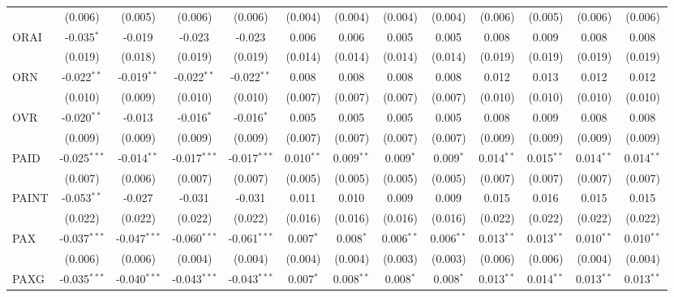 \begin{table}[!htbp]
\begin{tabular}{@{\extracolsep{5pt}}lcccccccccccc}
  & (0.006) & (0.005) & (0.006) & (0.006) & (0.004) & (0.004) & (0.004) & (0.004) & (0.006) & (0.005) & (0.006) & (0.006) \\
 ORAI & -0.035$^{*}$ & -0.019$^{}$ & -0.023$^{}$ & -0.023$^{}$ & 0.006$^{}$ & 0.006$^{}$ & 0.005$^{}$ & 0.005$^{}$ & 0.008$^{}$ & 0.009$^{}$ & 0.008$^{}$ & 0.008$^{}$ \\
  & (0.019) & (0.018) & (0.019) & (0.019) & (0.014) & (0.014) & (0.014) & (0.014) & (0.019) & (0.019) & (0.019) & (0.019) \\
 ORN & -0.022$^{**}$ & -0.019$^{**}$ & -0.022$^{**}$ & -0.022$^{**}$ & 0.008$^{}$ & 0.008$^{}$ & 0.008$^{}$ & 0.008$^{}$ & 0.012$^{}$ & 0.013$^{}$ & 0.012$^{}$ & 0.012$^{}$ \\
  & (0.010) & (0.009) & (0.010) & (0.010) & (0.007) & (0.007) & (0.007) & (0.007) & (0.010) & (0.010) & (0.010) & (0.010) \\
 OVR & -0.020$^{**}$ & -0.013$^{}$ & -0.016$^{*}$ & -0.016$^{*}$ & 0.005$^{}$ & 0.005$^{}$ & 0.005$^{}$ & 0.005$^{}$ & 0.008$^{}$ & 0.009$^{}$ & 0.008$^{}$ & 0.008$^{}$ \\
  & (0.009) & (0.009) & (0.009) & (0.009) & (0.007) & (0.007) & (0.007) & (0.007) & (0.009) & (0.009) & (0.009) & (0.009) \\
 PAID & -0.025$^{***}$ & -0.014$^{**}$ & -0.017$^{***}$ & -0.017$^{***}$ & 0.010$^{**}$ & 0.009$^{**}$ & 0.009$^{*}$ & 0.009$^{*}$ & 0.014$^{**}$ & 0.015$^{**}$ & 0.014$^{**}$ & 0.014$^{**}$ \\
  & (0.007) & (0.006) & (0.007) & (0.007) & (0.005) & (0.005) & (0.005) & (0.005) & (0.007) & (0.007) & (0.007) & (0.007) \\
 PAINT & -0.053$^{**}$ & -0.027$^{}$ & -0.031$^{}$ & -0.031$^{}$ & 0.011$^{}$ & 0.010$^{}$ & 0.009$^{}$ & 0.009$^{}$ & 0.015$^{}$ & 0.016$^{}$ & 0.015$^{}$ & 0.015$^{}$ \\
  & (0.022) & (0.022) & (0.022) & (0.022) & (0.016) & (0.016) & (0.016) & (0.016) & (0.022) & (0.022) & (0.022) & (0.022) \\
 PAX & -0.037$^{***}$ & -0.047$^{***}$ & -0.060$^{***}$ & -0.061$^{***}$ & 0.007$^{*}$ & 0.008$^{*}$ & 0.006$^{**}$ & 0.006$^{**}$ & 0.013$^{**}$ & 0.013$^{**}$ & 0.010$^{**}$ & 0.010$^{**}$ \\
  & (0.006) & (0.006) & (0.004) & (0.004) & (0.004) & (0.004) & (0.003) & (0.003) & (0.006) & (0.006) & (0.004) & (0.004) \\
 PAXG & -0.035$^{***}$ & -0.040$^{***}$ & -0.043$^{***}$ & -0.043$^{***}$ & 0.007$^{*}$ & 0.008$^{**}$ & 0.008$^{*}$ & 0.008$^{*}$ & 0.013$^{**}$ & 0.014$^{**}$ & 0.013$^{**}$ & 0.013$^{**}$ \\

\end{tabular}
\end{table}
